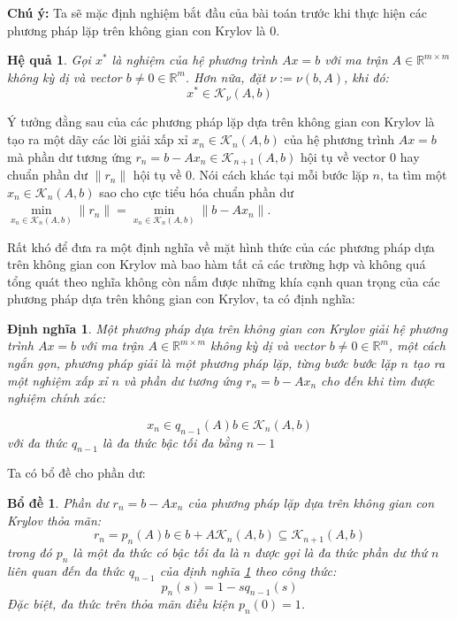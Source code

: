 \documentclass[14pt, a4paper]{article}
\numberwithin{equation}{section}
\numberwithin{algorithm}{section}
\numberwithin{figure}{section}
\newtheorem{bd}{Bổ đề}
\newtheorem{dn}{Định nghĩa}
\newtheorem{hq}{Hệ quả}
\numberwithin{dl}{section}
\numberwithin{md}{section}
\numberwithin{bd}{section}
\numberwithin{dn}{section}
\numberwithin{hq}{section}
\begin{document}
\textbf{Chú ý: }Ta sẽ mặc định nghiệm bắt đầu của bài toán trước khi thực hiện các phương pháp lặp trên không gian con Krylov là 0.

\begin{hq}
    Gọi $x^*$ là nghiệm của hệ phương trình $Ax=b$ với ma trận $A \in \mathbb{R}^{m \times m}$ không kỳ dị và vector $b \neq 0 \in \mathbb{R}^m$.
    Hơn nữa, đặt $\nu := \nu(b, A)$, khi đó:
    \begin{equation}
        x^* \in \mathcal{K}_{\nu}(A, b)
    \end{equation}
\end{hq}

Ý tưởng đằng sau của các phương pháp lặp dựa trên không gian con Krylov là tạo ra một dãy các lời giải xấp xỉ
$x_n \in \mathcal{K}_n(A, b)$ của hệ phương trình $Ax=b$ mà phần dư tương ứng $r_n = b - Ax_n \in \mathcal{K}_{n+1}(A, b)$ hội tụ về vector 0 hay chuẩn phần dư $\lVert r_n \rVert$ hội tụ về 0.
Nói cách khác tại mỗi bước lặp $n$, ta tìm một $x_n \in \mathcal{K}_n(A, b)$ sao cho cực tiểu hóa chuẩn phần dư $\underset{x_n \in \mathcal{K}_n(A, b)}{\min}\lVert r_n \rVert = \underset{x_n \in \mathcal{K}_n(A, b)}{\min}\lVert b - A x_n \rVert$.

Rất khó để đưa ra một định nghĩa về mặt hình thức của các phương pháp dựa trên không gian con Krylov mà bao hàm tất cả các trường hợp và không quá tổng quát theo nghĩa không còn nắm được những khía cạnh quan trọng của các phương pháp dựa trên không gian con Krylov, ta có định nghĩa:

\begin{dn} \label{dn:Krylov-Solver-Definition}
    Một phương pháp dựa trên không gian con Krylov giải hệ phương trình $Ax=b$ với ma trận $A \in \mathbb{R}^{m \times m}$ không kỳ dị và vector $b \neq 0 \in \mathbb{R}^m$, một cách ngắn gọn, phương pháp giải là một phương pháp lặp, từng bước bước lặp $n$ tạo ra một nghiệm xấp xỉ $n$ và phần dư tương ứng $r_n = b - A x_n$ cho đến khi tìm được nghiệm chính xác:

    \begin{equation}
        x_n \in q_{n-1}(A)b \in \mathcal{K}_n (A, b)
    \end{equation}
    với đa thức $q_{n-1}$ là đa thức bậc tối đa bằng $n-1$
\end{dn}

Ta có bổ đề cho phần dư:

\begin{bd}
    Phần dư $r_n = b - A x_n$ của phương pháp lặp dựa trên không gian con Krylov thỏa mãn:
    \begin{equation}
        r_n = p_n(A)b \in b + A \mathcal{K}_n(A, b) \subseteq \mathcal{K}_{n+1}(A, b)
    \end{equation}
    trong đó $p_n$ là một đa thức có bậc tối đa là $n$ được gọi là đa thức phần dư thứ $n$ liên quan đến đa thức $q_{n-1}$ của định nghĩa \ref{dn:Krylov-Solver-Definition} theo công thức:
    \begin{equation}
        p_n(s) = 1 - sq_{n-1}(s)
    \end{equation}
    Đặc biệt, đa thức trên thỏa mãn điều kiện $p_n(0)=1$.
\end{bd}
\end{document}
